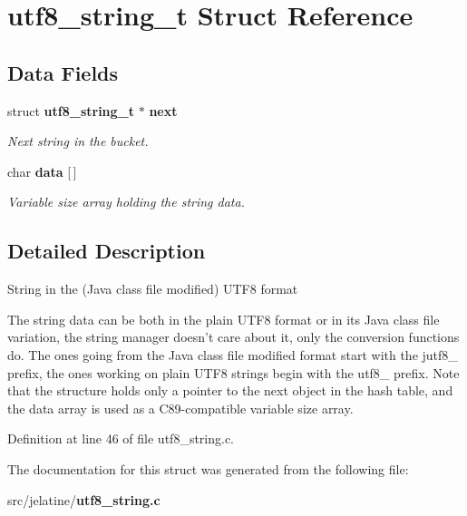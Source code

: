 \section{utf8\_\-string\_\-t Struct Reference}
\label{structutf8__string__t}
\subsection*{Data Fields}
\begin{DoxyCompactItemize}
\item 
struct {\bf utf8\_\-string\_\-t} $\ast$ {\bf next}\label{structutf8__string__t_a77a7a2e16c8cefe509f7d9ca9d315e4c}

\begin{DoxyCompactList}\small\item\em Next string in the bucket. \item\end{DoxyCompactList}\item 
char {\bf data} [$\,$]\label{structutf8__string__t_ad77a06e419d01185d65ba43d53a39605}

\begin{DoxyCompactList}\small\item\em Variable size array holding the string data. \item\end{DoxyCompactList}\end{DoxyCompactItemize}


\subsection{Detailed Description}
String in the (Java class file modified) UTF8 format

The string data can be both in the plain UTF8 format or in its Java class file variation, the string manager doesn't care about it, only the conversion functions do. The ones going from the Java class file modified format start with the jutf8\_\- prefix, the ones working on plain UTF8 strings begin with the utf8\_\- prefix. Note that the structure holds only a pointer to the next object in the hash table, and the data array is used as a C89-\/compatible variable size array. 

Definition at line 46 of file utf8\_\-string.c.



The documentation for this struct was generated from the following file:\begin{DoxyCompactItemize}
\item 
src/jelatine/{\bf utf8\_\-string.c}\end{DoxyCompactItemize}
